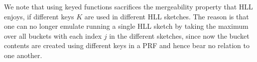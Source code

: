 \documentclass{article}
\begin{document}








We note that using keyed functions sacrifices the mergeability property that HLL enjoys, if different keys $K$ are used in different HLL sketches. The reason is that one can no longer emulate running a single HLL sketch by taking the maximum over all buckets with each index $j$ in the different sketches, since now the bucket contents are created using different keys in a PRF and hence bear no relation to one another. 
\end{document}
